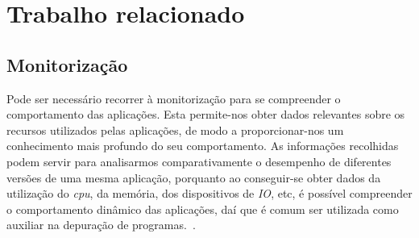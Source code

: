 \chapter{Trabalho relacionado}
\label{cap:trabrelacionado}

 
% 
% 


\section{Monitorização} \label{sect:descricao}

Pode ser necessário recorrer à monitorização para se compreender o comportamento das aplicações.
Esta permite-nos obter dados relevantes sobre os recursos utilizados pelas aplicações, de modo a proporcionar-nos um conhecimento mais profundo do seu comportamento.
As informações recolhidas podem servir para analisarmos comparativamente o desempenho de diferentes versões de uma mesma aplicação, porquanto ao conseguir-se obter dados da utilização do \textit{cpu}, da memória, dos dispositivos de \textit{IO}, etc, é possível compreender o comportamento dinâmico das aplicações, daí que é comum ser utilizada como auxiliar na depuração de programas.~\cite{DuartePhd05}.

